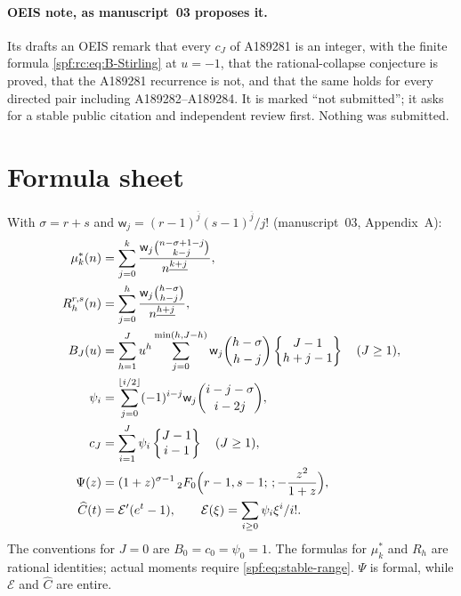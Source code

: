 \documentclass[11pt]{article}
\numberwithin{equation}{section}
\theoremstyle{definition}
\theoremstyle{remark}
\theoremstyle{definition}
\newcommand{\fall}[2]{{#1}^{\underline{#2}}}
\newcommand{\rise}[2]{{#1}^{\overline{#2}}}
\newcommand{\rcw}{\mathsf w}
\newcommand{\Stir}[2]{\left\{\begin{matrix}#1\\#2\end{matrix}\right\}}
\begin{document}
\paragraph{OEIS note, as manuscript~03 proposes it.} Its
 drafts an OEIS
remark that every $c_J$ of A189281 is an integer, with the finite formula
\eqref{spf:rc:eq:B-Stirling} at $u=-1$, that the rational-collapse conjecture
is proved, that the A189281 recurrence is not, and that the same holds for
every directed pair including A189282--A189284. It is marked ``not
submitted''; it asks for a stable public citation and independent review
first. Nothing was submitted.

\section{Formula sheet}
\label{spf:rc:sec:formulas}

With $\sigma=r+s$ and $\rcw_j=\rise{(r-1)}j\rise{(s-1)}j/j!$ (manuscript~03,
Appendix~A):
\begin{align}
 \mu_k^*(n)&=\sum_{j=0}^k
  \frac{\rcw_j\binom{n-\sigma+1-j}{k-j}}{\fall n{k+j}},\notag\\
 R_h^{r,s}(n)&=\sum_{j=0}^h
  \frac{\rcw_j\binom{h-\sigma}{h-j}}{\fall n{h+j}},\notag\\
 B_J(u)&=\sum_{h=1}^Ju^h\sum_{j=0}^{\min(h,J-h)}
  \rcw_j\binom{h-\sigma}{h-j}\Stir{J-1}{h+j-1}\quad(J\ge1),\notag\\
 \psi_i&=\sum_{j=0}^{\lfloor i/2\rfloor}
  (-1)^{i-j}\rcw_j\binom{i-j-\sigma}{i-2j},\label{spf:rc:eq:psi}\\
 c_J&=\sum_{i=1}^J\psi_i\Stir{J-1}{i-1}\quad(J\ge1),\notag\\
 \Psi(z)&=(1+z)^{\sigma-1}\,{}_2F_0\Bigl(r-1,s-1;\,;-\frac{z^2}{1+z}\Bigr),\notag\\
 \widehat C(t)&=\mathcal E'(e^t-1),\qquad
 \mathcal E(\xi)=\sum_{i\ge0}\psi_i\xi^i/i!.\notag
\end{align}
The conventions for $J=0$ are $B_0=c_0=\psi_0=1$. The formulas for
$\mu_k^*$ and $R_h$ are rational identities; actual moments require
\eqref{spf:eq:stable-range}. $\Psi$ is formal, while $\mathcal E$ and
$\widehat C$ are entire.
\end{document}
